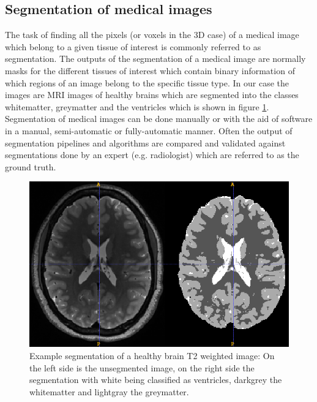 \documentclass[journal]{IEEEtran}
\begin{document}
\subsection{Segmentation of medical images}
The task of finding all the pixels (or voxels in the 3D case) of a medical image which belong to a given tissue of interest is commonly referred to as segmentation. The outputs of the segmentation of a medical image are normally masks for the different tissues of interest which contain binary information of which regions of an image belong to the specific tissue type. In our case the images are MRI images of healthy brains which are segmented into the classes whitematter, greymatter and the ventricles which is shown in figure \ref{fig:brainseg}. Segmentation of medical images can be done manually or with the aid of software in a manual, semi-automatic or fully-automatic manner. Often the output of segmentation pipelines and algorithms are compared and validated against segmentations done by an expert (e.g. radiologist) which are referred to as the ground truth.

\begin{figure}[!t]
\centering
\includegraphics[width=\linewidth]{img/mer}
\caption{Example segmentation of a healthy brain T2 weighted image: On the left side is the unsegmented image, on the right side the segmentation with white being classified as ventricles, darkgrey the whitematter and lightgray the greymatter.}
\label{fig:brainseg}
\end{figure}
\end{document}
